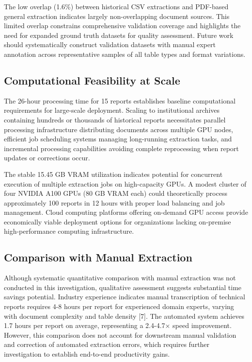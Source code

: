 \documentclass{svproc}
\begin{document}
The low overlap (1.6\%) between historical CSV extractions and PDF-based general extraction indicates largely non-overlapping document sources. This limited overlap constrains comprehensive validation coverage and highlights the need for expanded ground truth datasets for quality assessment. Future work should systematically construct validation datasets with manual expert annotation across representative samples of all table types and format variations.

\subsection{Computational Feasibility at Scale}

The 26-hour processing time for 15 reports establishes baseline computational requirements for large-scale deployment. Scaling to institutional archives containing hundreds or thousands of historical reports necessitates parallel processing infrastructure distributing documents across multiple GPU nodes, efficient job scheduling systems managing long-running extraction tasks, and incremental processing capabilities avoiding complete reprocessing when report updates or corrections occur.

The stable 15.45 GB VRAM utilization indicates potential for concurrent execution of multiple extraction jobs on high-capacity GPUs. A modest cluster of four NVIDIA A100 GPUs (80 GB VRAM each) could theoretically process approximately 100 reports in 12 hours with proper load balancing and job management. Cloud computing platforms offering on-demand GPU access provide economically viable deployment options for organizations lacking on-premise high-performance computing infrastructure.

\subsection{Comparison with Manual Extraction}

Although systematic quantitative comparison with manual extraction was not conducted in this investigation, qualitative assessment suggests substantial time savings potential. Industry experience indicates manual transcription of technical reports requires 4-8 hours per report for experienced domain experts, varying with document complexity and table density [7]. The automated system achieves 1.7 hours per report on average, representing a 2.4-4.7× speed improvement. However, this comparison does not account for downstream manual validation and correction of automated extraction errors, which requires further investigation to establish end-to-end productivity gains.
\end{document}
